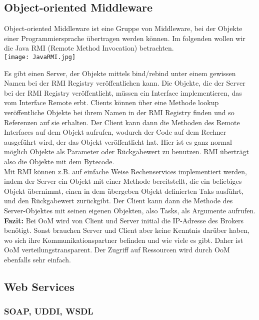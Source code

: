 \subsection{Object-oriented Middleware}

Object-oriented Middleware ist eine Gruppe von Middleware, bei der Objekte einer Programmiersprache übertragen werden können. Im folgenden wollen wir die Java RMI (Remote Method Invocation) betrachten.\\

\texttt{[image: JavaRMI.jpg]}

Es gibt einen Server, der Objekte mittels bind/rebind unter einem gewissen Namen bei der RMI Registry veröffentlichen kann. Die Objekte, die der Server bei der RMI Registry veröffentlicht, müssen ein Interface implementieren, das vom Interface Remote erbt. Clients können über eine Methode lookup veröffentliche Objekte bei ihrem Namen in der RMI Registry finden und so Referenzen auf sie erhalten. Der Client kann dann die Methoden des Remote Interfaces auf dem Objekt aufrufen, wodurch der Code auf dem Rechner ausgeführt wird, der das Objekt veröffentlicht hat. Hier ist es ganz normal möglich Objekte als Parameter oder Rückgabewert zu benutzen. RMI überträgt also die Objekte mit dem Bytecode.\\
Mit RMI können z.B. auf einfache Weise Rechenservices implementiert werden, indem der Server ein Objekt mit einer Methode bereitstellt, die ein beliebiges Objekt übernimmt, einen in dem übergeben Objekt definierten Taks ausführt, und den Rückgabewert zurückgibt. Der Client kann dann die Methode des Server-Objektes mit seinen eigenen Objekten, also Tasks, als Argumente aufrufen.\\

\textbf{Fazit:} Bei OoM wird von Client und Server initial die IP-Adresse des Brokers benötigt. Sonst brauchen Server und Client aber keine Kenntnis darüber haben, wo sich ihre Kommunikationspartner befinden und wie viele es gibt. Daher ist OoM verteilungstransparent. Der Zugriff auf Ressourcen wird durch OoM ebenfalls sehr einfach.

\subsection{Web Services}
\subsubsection{SOAP, UDDI, WSDL}

